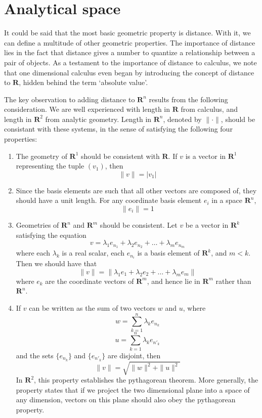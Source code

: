 \documentclass[12pt]{amsbook}
\theoremstyle{plain}
\theoremstyle{definition}
\begin{document}
\mainmatter

\chapter{Analytical space}

It could be said that the most basic geometric property is distance. With it, we can define a multitude of other geometric properties. The importance of distance lies in the fact that distance gives a number to quantize a relationship between a pair of objects. As a testament to the importance of distance to calculus, we note that one dimensional calculus even began by introducing the concept of distance to $\mathbf{R}$, hidden behind the term `absolute value'.

The key observation to adding distance to $\mathbf{R}^n$ results from the following consideration. We are well experienced with length in $\mathbf{R}$ from calculus, and length in $\mathbf{R}^2$ from analytic geometry. Length in $\mathbf{R}^n$, denoted by $\| \cdot \|$, should be consistant with these systems, in the sense of satisfying the following four properties:

\begin{enumerate}
  \item The geometry of $\mathbf{R}^1$ should be consistent with $\mathbf{R}$. If $v$ is a vector in $\mathbf{R}^1$ representing the tuple $(v_1)$, then
  \[ \|v\| = |v_1| \]
  \item Since the basis elements are such that all other vectors are composed of, they should have a unit length. For any coordinate basis element $e_i$ in a space $\mathbf{R}^n$,
  \[ \|e_i\| = 1 \]
  \item Geometries of $\mathbf{R}^n$ and $\mathbf{R}^m$ should be consistent. Let $v$ be a vector in $\mathbf{R}^k$ satisfying the equation
  \[ v = \lambda_1 e_{n_1} + \lambda_2 e_{n_2} + \dots + \lambda_m e_{n_m} \]
  where each $\lambda_k$ is a real scalar, each $e_{n_i}$ is a basis element of $\mathbf{R}^k$, and $m < k$. Then we should have that
  \[ \|v\| = \| \lambda_1 e_1 + \lambda_2 e_2 + \dots + \lambda_m e_m \| \]
  where $e_k$ are the coordinate vectors of $\mathbf{R}^m$, and hence lie in $\mathbf{R}^m$ rather than $\mathbf{R}^n$.
  \item If $v$ can be written as the sum of two vectors $w$ and $u$, where
  \[ w = \sum_{k = 1}^n \lambda_k e_{n_k} \]
  \[ u = \sum_{k = 1}^n \lambda_k e_{n'_k} \]
  and the sets $\{ e_{n_k} \}$ and $\{ e_{n'_k} \}$ are disjoint, then
  \[ \|v\| = \sqrt{ \|w\|^2 + \|u\|^2 } \]
  In $\mathbf{R}^2$, this property establishes the pythagorean theorem. More generally, the property states that if we project the two dimensional plane into a space of any dimension, vectors on this plane should also obey the pythagorean property.
\end{enumerate}
\end{document}
